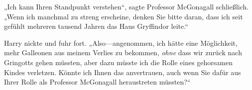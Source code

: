 






„Ich kann Ihren Standpunkt verstehen“, sagte Professor McGonagall schließlich. „Wenn ich manchmal zu streng erscheine, denken Sie bitte daran, dass ich seit gefühlt mehreren tausend Jahren das Haus Gryffindor leite.“

Harry nickte und fuhr fort. „Also—angenommen, ich hätte eine Möglichkeit, mehr Galleonen aus meinem Verlies zu bekommen, \emph{ohne} dass wir zurück nach Gringotts gehen müssten, aber dazu müsste ich die Rolle eines gehorsamen Kindes verletzen. Könnte ich Ihnen das anvertrauen, auch wenn Sie dafür aus Ihrer Rolle als Professor McGonagall heraustreten müssten?“

